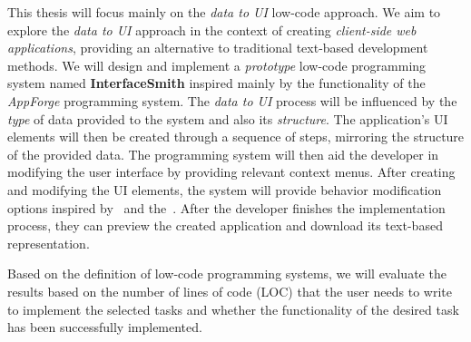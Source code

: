 This thesis will focus mainly on the \emph{data to UI} low-code approach.
We aim to explore the \emph{data to UI} approach in the context of creating \emph{client-side web applications}, providing an alternative to traditional text-based development methods.
We will design and implement a \emph{prototype} low-code programming system named \textbf{InterfaceSmith} inspired mainly by the functionality of the \emph{AppForge} programming system.
The \emph{data to UI} process will be influenced by the \emph{type} of data provided to the system and also its \emph{structure}.
The application's UI elements will then be created through a sequence of steps, mirroring the structure of the provided data.
The programming system will then aid the developer in modifying the user interface by providing relevant context menus.
After creating and modifying the UI elements, the system will provide behavior modification options inspired by~\citet{elm} and the~\citet{elm-arch}.
After the developer finishes the implementation process, they can preview the created application and download its text-based representation.

Based on the definition of low-code programming systems, we will evaluate the results based on the number of lines of code (LOC) that the user needs to write to implement the selected tasks and whether the functionality of the desired task has been successfully implemented.

\medskip
